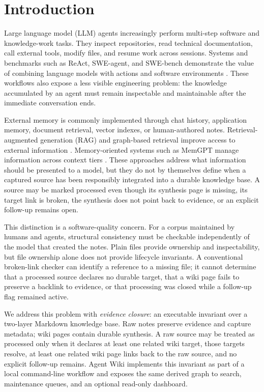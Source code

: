\documentclass[preprint,12pt,a4paper]{elsarticle}
\begin{document}
\section{Introduction}

Large language model (LLM) agents increasingly perform multi-step software and
knowledge-work tasks. They inspect repositories, read technical documentation,
call external tools, modify files, and resume work across sessions. Systems and
benchmarks such as ReAct, SWE-agent, and SWE-bench demonstrate the value of
combining language models with actions and software environments
\cite{yao2023react,jimenez2024swebench,yang2024sweagent}. These workflows also
expose a less visible engineering problem: the knowledge accumulated by an
agent must remain inspectable and maintainable after the immediate conversation
ends.

External memory is commonly implemented through chat history, application
memory, document retrieval, vector indexes, or human-authored notes. Retrieval-
augmented generation (RAG) and graph-based retrieval improve access to external
information \cite{lewis2020rag,edge2024graphrag}. Memory-oriented systems such
as MemGPT manage information across context tiers \cite{packer2023memgpt}.
These approaches address what information should be presented to a model, but
they do not by themselves define when a captured source has been responsibly
integrated into a durable knowledge base. A source may be marked processed even
though its synthesis page is missing, its target link is broken, the synthesis
does not point back to evidence, or an explicit follow-up remains open.

This distinction is a software-quality concern. For a corpus maintained by
humans and agents, structural consistency must be checkable independently of
the model that created the notes. Plain files provide ownership and
inspectability, but file ownership alone does not provide lifecycle invariants.
A conventional broken-link checker can identify a reference to a missing file;
it cannot determine that a processed source declares no durable target, that a
wiki page fails to preserve a backlink to evidence, or that processing was
closed while a follow-up flag remained active.

We address this problem with \emph{evidence closure}: an executable invariant
over a two-layer Markdown knowledge base. Raw notes preserve evidence and
capture metadata; wiki pages contain durable synthesis. A raw source may be
treated as processed only when it declares at least one related wiki target,
those targets resolve, at least one related wiki page links back to the raw
source, and no explicit follow-up remains. Agent Wiki implements this invariant
as part of a local command-line workflow and exposes the same derived graph to
search, maintenance queues, and an optional read-only dashboard.
\end{document}
